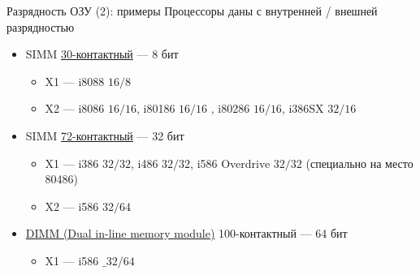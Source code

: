 \documentclass[xetex,aspectratio=43]{beamer}
\begin{document}
\begin{frame}{Разрядность ОЗУ (2): примеры}
Процессоры даны с внутренней / внешней разрядностью

\begin{itemize}
    \tightlist

    \item
    SIMM
    \href{https://en.wikipedia.org/wiki/SIMM\#30-pin_SIMMs}{30-контактный}
    --- 8 бит

    \begin{itemize}
        \tightlist
        \item
        X1 --- i8088 \({16/8}\)
        \item
        X2 --- i8086 \({16/16}\), i80186 \({16/16}\) , i80286
        \({16/16}\), i386SX \({32/16}\)
    \end{itemize}

    \item
    SIMM
    \href{https://en.wikipedia.org/wiki/SIMM\#72-pin_SIMMs}{72-контактный}
    --- 32 бит

    \begin{itemize}
        \tightlist
        \item
        X1 --- i386 \({32/32}\), i486 \({32/32}\), i586 Overdrive
        \({32/32}\) (специально на место 80486)
        \item
        X2 --- i586 \({32/64}\)
    \end{itemize}

    \item
    \href{https://en.wikipedia.org/wiki/DIMM}{DIMM (Dual in-line memory
        module)} 100-контактный --- 64 бит

    \begin{itemize}
        \tightlist
        \item
        X1 --- i586 \(\_{32/64}\)
    \end{itemize}
\end{itemize}

\end{frame}
\end{document}
